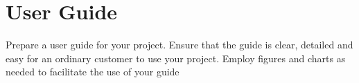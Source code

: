 \chapter{User Guide}
Prepare a user guide for your project. Ensure that the guide is clear, detailed and easy for an ordinary customer to use your project. Employ figures and charts as needed to facilitate the use of your guide
